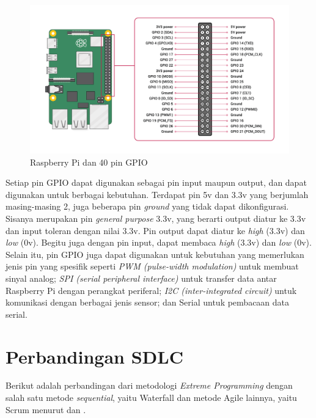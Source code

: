 \begin{figure}[!h]
    \includegraphics[width=1\linewidth, center]{images/tinjauan-pustaka/fig-raspy.png}
    \caption{Raspberry Pi dan 40 pin GPIO}
    \label{fig:raspy}
\end{figure}

Setiap pin GPIO dapat digunakan sebagai pin input maupun output, dan dapat digunakan untuk berbagai kebutuhan. Terdapat pin 5v dan 3.3v yang berjumlah masing-masing 2, juga beberapa pin \textit{ground} yang tidak dapat dikonfigurasi. Sisanya merupakan pin \textit{general purpose} 3.3v, yang berarti  output diatur ke 3.3v dan input toleran dengan nilai 3.3v. Pin output dapat diatur ke \textit{high} (3.3v) dan \textit{low} (0v). Begitu juga dengan pin input, dapat membaca \textit{high} (3.3v) dan \textit{low} (0v). Selain itu, pin GPIO juga dapat digunakan untuk kebutuhan yang memerlukan jenis pin yang spesifik seperti \textit{PWM (pulse-width modulation)} untuk membuat sinyal analog; \textit{SPI (serial peripheral interface)} untuk transfer data antar Raspberry Pi dengan perangkat periferal; \textit{I2C (inter-integrated circuit)} untuk komunikasi dengan berbagai jenis sensor; dan Serial untuk pembacaan data serial.

\section{Perbandingan SDLC}

Berikut adalah perbandingan dari metodologi \textit{Extreme Programming} dengan salah satu metode \textit{sequential}, yaitu Waterfall dan metode Agile lainnya, yaitu Scrum menurut \textcite{inproc:fahrurrozi} dan \textcite{article:suryantara}.

\newpage

